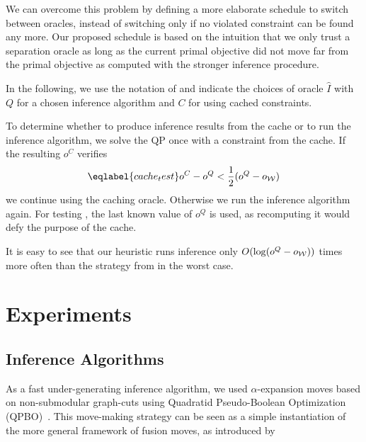 We can overcome this problem by defining a more elaborate schedule to switch
between oracles, instead of switching only if no violated constraint can be
found any more. Our proposed schedule is based on the intuition that we only
trust a separation oracle as long as the current primal objective did not move
far from the primal objective as computed with the stronger inference
procedure.


In the following, we use the notation of  and indicate
the choices of oracle $\hat{I}$ with $Q$ for a chosen inference algorithm and $C$ for
using cached constraints.

To determine whether to produce inference results from the cache or to run the inference algorithm,
we solve the QP once with a constraint from the cache. If the resulting $o^C$ verifies
\begin{equation}\eqlabel{cache_test}
    o^C - o^Q < \frac{1}{2} (o^Q - o_{\W})
\end{equation}
we continue using the caching oracle. Otherwise we run the inference algorithm again.
For testing , the last known value of $o^Q$ is used, as recomputing it would defy
the purpose of the cache.

It is easy to see that our heuristic runs inference only $O(\log(o^Q -
o_{\mathcal{W}}))$ times more often than the strategy from \citet{joachims2009cutting} in the
worst case.


\section{Experiments}

\subsection{Inference Algorithms}

As a fast under-generating inference algorithm, we used $\alpha$-expansion
moves based on non-submodular graph-cuts using Quadratid Pseudo-Boolean
Optimization (QPBO)~\citep{rother2007optimizing}.  This move-making strategy
can be seen as a simple instantiation of the more general framework of fusion
moves, as introduced by \citet{lempitsky2010fusion}


